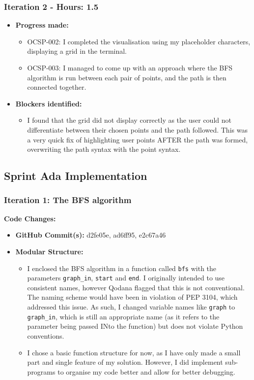 \subsubsection{Iteration 2 - Hours: 1.5}
\begin{itemize}
    \item \textbf{Progress made:}
    \begin{itemize}
        \item OCSP-002: I completed the visualisation using my placeholder characters, displaying a grid in the terminal.
        \item OCSP-003: I managed to come up with an approach where the BFS algorithm is run between each pair of points, and the path is then connected together.
    \end{itemize}
    \item \textbf{Blockers identified:}
    \begin{itemize}
        \item I found that the grid did not display correctly as the user could not differentiate between their chosen points and the path followed. This was a very quick fix of highlighting user points AFTER the path was formed, overwriting the path syntax with the point syntax.

    \end{itemize}
\end{itemize}


\clearpage
\subsection{Sprint Ada Implementation}

\subsubsection{Iteration 1: The BFS algorithm}

\textbf{Code Changes:}
\begin{itemize}
    \item \textbf{GitHub Commit(s):} d2fe05e, ad6ff95, e2c67a46
    \item \textbf{Modular Structure:}
    \begin{itemize}
        \item I enclosed the BFS algorithm in a function called \verb|bfs| with the parameters \verb|graph_in|, \verb|start| and \verb|end|. I originally intended to use consistent names, however Qodana flagged that this is not conventional. The naming scheme would have been in violation of PEP 3104, which addressed this issue. As such, I changed variable names like \verb|graph| to \verb|graph_in|, which is still an appropriate name (as it refers to the parameter being passed INto the function) but does not violate Python conventions.
        \item I chose a basic function structure for now, as I have only made a small part and single feature of my solution. However, I did implement sub-programs to organise my code better and allow for better debugging.
    \end{itemize}
\end{itemize}

